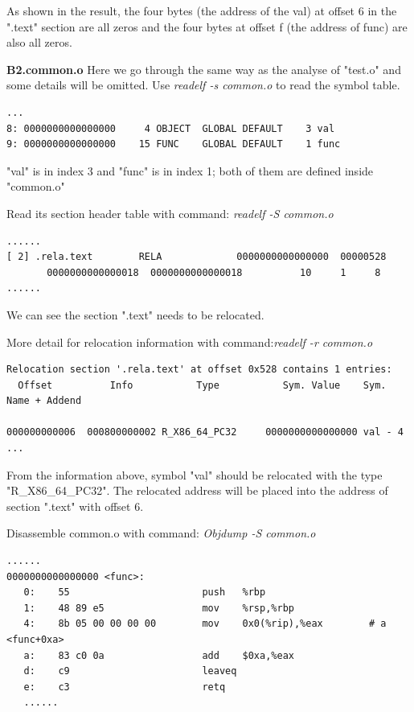      As shown in the result, the four bytes (the address of the val) at offset 6 in the ".text" section are all zeros and the four bytes at offset f (the address of func) are also all zeros.
     
     
    \textbf{B2.common.o}
    Here we go through the same way as the analyse of "test.o" and some details will be omitted.
    Use \textit{readelf -s common.o} to read the symbol table.
    \begin{lstlisting}[caption = Symbol table of common.o]
    ...
8: 0000000000000000     4 OBJECT  GLOBAL DEFAULT    3 val 
9: 0000000000000000    15 FUNC    GLOBAL DEFAULT    1 func    
    \end{lstlisting}
    "val" is in index 3 and "func" is in index 1; both of them are defined inside "common.o"\newline
        
    Read its section header table with command: \textit{readelf -S common.o}
    \begin{lstlisting}[caption = Section header table of common.o]
    ......
[ 2] .rela.text        RELA             0000000000000000  00000528 
       0000000000000018  0000000000000018          10     1     8 
......
    \end{lstlisting}
    We can see the section ".text" needs to be relocated.\newline
    
    
    More detail for relocation information with command:\textit{readelf -r common.o}
     \begin{lstlisting}[caption = Relocation section  of common.o]
Relocation section '.rela.text' at offset 0x528 contains 1 entries: 
  Offset          Info           Type           Sym. Value    Sym. Name + Addend 
  
000000000006  000800000002 R_X86_64_PC32     0000000000000000 val - 4 
...
     \end{lstlisting}
    From the information above, symbol "val" should be relocated with the type "R\_X86\_64\_PC32". The relocated address will be placed into the address of section ".text" with offset 6. \newline
    
    
    Disassemble common.o with command: \textit{Objdump -S common.o}
    \begin{lstlisting}[caption = Disassemble common.o]
    ......
0000000000000000 <func>: 
   0:    55                       push   %rbp 
   1:    48 89 e5                 mov    %rsp,%rbp 
   4:    8b 05 00 00 00 00        mov    0x0(%rip),%eax        # a <func+0xa> 
   a:    83 c0 0a                 add    $0xa,%eax 
   d:    c9                       leaveq 
   e:    c3                       retq 
   ......
    \end{lstlisting}
    
